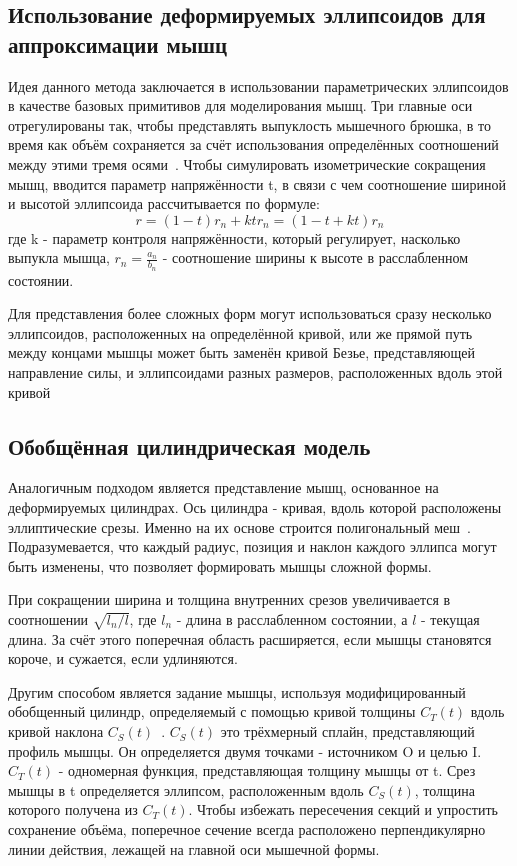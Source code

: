 \subsection{Использование деформируемых эллипсоидов для аппроксимации мышц}
\label{subsec:elypsoids}
Идея данного метода заключается в использовании параметрических эллипсоидов в качестве базовых примитивов для моделирования мышц. Три главные оси отрегулированы так, чтобы представлять выпуклость мышечного брюшка, в то время как объём сохраняется за счёт использования определённых соотношений между этими тремя осями~\cite{scheepers97}. Чтобы симулировать изометрические сокращения мышц, вводится параметр напряжённости t, в связи с чем соотношение шириной и высотой эллипсоида рассчитывается по формуле:
\begin{equation}\label{r_eq}
r = (1 - t)r_{n} + ktr_{n} = (1 - t + kt)r_{n}
\end{equation}
где k - параметр контроля напряжённости, который регулирует, насколько выпукла мышца, $r_{n} = \frac{a_{n}}{b_{n}}$ - соотношение ширины к высоте в расслабленном состоянии. 
\par Для представления более сложных форм могут использоваться сразу несколько эллипсоидов, расположенных на определённой кривой, или же прямой путь между концами мышцы может быть заменён кривой Безье, представляющей направление силы, и эллипсоидами разных размеров, расположенных вдоль этой кривой~\cite{scheepers97}

\subsection{Обобщённая цилиндрическая модель}
\label{subsec:cylinder}
Аналогичным подходом является представление мышц, основанное на деформируемых цилиндрах. Ось цилиндра - кривая, вдоль которой расположены эллиптические срезы. Именно на их основе строится полигональный меш~\cite{Wilhelms97}. Подразумевается, что каждый радиус, позиция и наклон каждого эллипса могут быть изменены, что позволяет формировать мышцы сложной формы.
\par При сокращении ширина и толщина внутренних срезов увеличивается в соотношении $\sqrt{l_{n} / l}$, где $l_{n}$ - длина в расслабленном состоянии, а $l$ - текущая длина. За счёт этого поперечная область расширяется, если мышцы становятся короче, и сужается, если удлиняются.
\par Другим способом является задание мышцы, используя модифицированный обобщенный цилиндр, определяемый с помощью кривой толщины $C_{T}(t)$ вдоль кривой наклона $C_{S}(t)$~\cite{ramos}. $C_{S}(t)$ это трёхмерный сплайн, представляющий профиль мышцы. Он определяется двумя точками - источником O и целью I. $C_{T}(t)$ - одномерная функция, представляющая толщину мышцы от t. Срез мышцы в t определяется эллипсом, расположенным вдоль $C_{S}(t)$, толщина которого получена из $C_{T}(t)$. Чтобы избежать пересечения секций и упростить сохранение объёма, поперечное сечение всегда расположено перпендикулярно линии действия, лежащей на главной оси мышечной формы.

